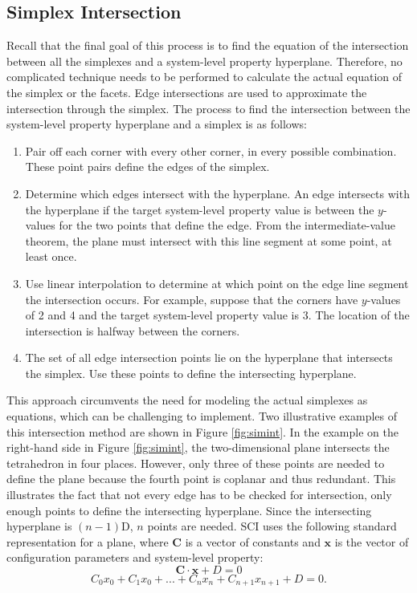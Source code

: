 \subsection{Simplex Intersection}
Recall that the final goal of this process is to find the equation of the intersection between all the simplexes and a system-level property hyperplane.
Therefore, no complicated technique needs to be performed to calculate the actual equation of the simplex or the facets.
Edge intersections are used to approximate the intersection through the simplex.
The process to find the intersection between the system-level property hyperplane and a simplex is as follows:
\begin{enumerate}
   \item Pair off each corner with every other corner, in every possible combination. These point pairs define the edges of the simplex.
   \item Determine which edges intersect with the hyperplane. An edge intersects with the hyperplane if the target system-level property value  is between the $y$-values for the two points that define the edge. From the intermediate-value theorem, the plane must intersect with this line segment at some point, at least once.
   \item Use linear interpolation to determine at which point on the edge line segment the intersection occurs.
For example, suppose that the corners have $y$-values of 2 and 4 and the target system-level property value is 3.
The location of the intersection is halfway between the corners.
   \item The set of all edge intersection points lie on the hyperplane that intersects the simplex. Use these points to define the intersecting hyperplane.
\end{enumerate}
This approach circumvents the need for modeling the actual simplexes as equations, which can be challenging to implement.
Two illustrative examples of this intersection method are shown in Figure \ref{fig:simint}.
In the example on the right-hand side in Figure \ref{fig:simint}, the two-dimensional plane intersects the tetrahedron in four places.
However, only three of these points are needed to define the plane because the fourth point is coplanar and thus redundant.
This illustrates the fact that not every edge has to be checked for intersection, only enough points to define the intersecting hyperplane.
Since the intersecting hyperplane is $(n-1)$D, $n$ points are needed.
SCI uses the following standard representation for a plane, where $\mathbf C$ is a vector of constants and $\mathbf x$ is the vector of configuration parameters and system-level property:
\[\mathbf C \cdot \mathbf x + D = 0\]
\[C_0 x_0 + C_1 x_0 + ... + C_n x_n + C_{n+1} x_{n+1} + D = 0. \]

